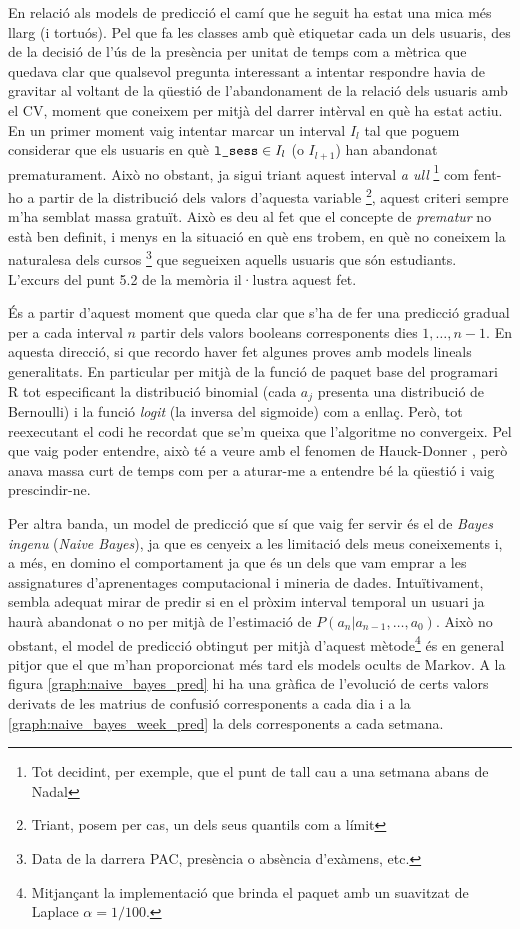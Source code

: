 \documentclass[
	a4paper,
	twoside,
	justified
]{tufte-handout}
\begin{document}
En relació als models de predicció el camí que he seguit ha estat una mica més llarg (i tortuós). Pel que fa les classes amb què etiquetar cada un dels usuaris, des de la decisió de l'ús de la presència per unitat de temps com a mètrica que quedava clar que qualsevol pregunta interessant a intentar respondre havia de gravitar al voltant de la qüestió de l'abandonament de la relació dels usuaris amb el CV, moment que coneixem per mitjà del darrer intèrval en què ha estat actiu. En un primer moment vaig intentar marcar un interval $I_l$ tal que poguem considerar que els usuaris en què $\texttt{l\_sess} \in I_l$ (o $I_{l+1}$) han abandonat prematurament. Això no obstant, ja sigui triant aquest interval \emph{a ull} \footnote{Tot decidint, per exemple, que el punt de tall cau a una setmana abans de Nadal} com fent-ho a partir de la distribució dels valors d'aquesta variable \footnote{Triant, posem per cas, un dels seus quantils com a límit}, aquest criteri sempre m'ha semblat massa gratuït. Això es deu al fet que el concepte de \emph{prematur} no està ben definit, i menys en la situació en què ens trobem, en què no coneixem la naturalesa dels cursos \footnote{Data de la darrera PAC, presència o absència d'exàmens, etc.} que segueixen aquells usuaris que són estudiants. L'excurs del punt 5.2 de la memòria il·lustra aquest fet.                

És a partir d'aquest moment que queda clar que s'ha de fer una predicció gradual per a cada interval $n$ partir dels valors booleans corresponents dies $1,\ldots,n-1$. En aquesta direcció, si que recordo haver fet algunes proves amb models lineals generalitats. En particular per mitjà de la funció  de paquet base del programari R tot especificant la distribució binomial (cada $a_j$ presenta una distribució de Bernoulli) i la funció \emph{logit} (la inversa del sigmoide) com a enllaç. Però, tot reexecutant el codi he recordat que se'm queixa que l'algoritme no convergeix. Pel que vaig poder entendre, això té a veure amb el fenomen de Hauck-Donner \citep[p. 197–8]{venables02}, però anava massa curt de temps com per a aturar-me a entendre bé la qüestió i vaig prescindir-ne.   

Per altra banda, un model de predicció que sí que vaig fer servir és el de \emph{Bayes ingenu} (\emph{Naive Bayes}), ja que es cenyeix a les limitació dels meus coneixements i, a més, en domino el comportament ja que és un dels que vam emprar a les assignatures d'aprenentages computacional i mineria de dades. Intuïtivament, sembla adequat mirar de predir si en el pròxim interval temporal un usuari ja haurà abandonat o no per mitjà de l'estimació de $P(a_n|a_{n-1}, \ldots, a_0)$. Això no obstant, el model de predicció obtingut per mitjà d'aquest mètode\footnote{Mitjançant la implementació que brinda el paquet  \citep{meyer14} amb un suavitzat de Laplace $\alpha = 1/100$.} és en general pitjor que el que m'han proporcionat més tard els models ocults de Markov. A la figura \ref{graph:naive_bayes_pred} hi ha una gràfica de l'evolució de certs valors derivats de les matrius de confusió corresponents a cada dia i a la \ref{graph:naive_bayes_week_pred} la dels corresponents a cada setmana.     
\end{document}
